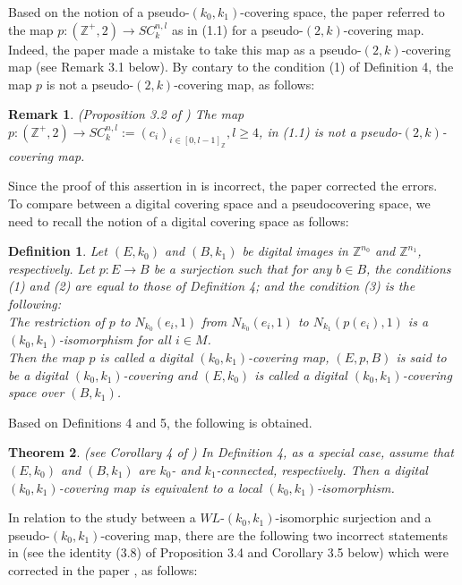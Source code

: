 \documentclass[J,12pt]{amsart}
\newtheorem{theorem}{Theorem}[section]
\newtheorem{definition}{Definition}
\newtheorem{remark}[theorem]{Remark}
\begin{document}
Based on the notion of a pseudo-$(k_0, k_1)$-covering space, 
the paper \cite{H6} referred to the map $p:({\mathbb Z}^+, 2) \to SC_k^{n,l}$ as in (1.1) for a pseudo-$(2,k)$-covering map. 
Indeed, the paper \cite{H6} made a mistake to take this map as a pseudo-$(2,k)$-covering map (see Remark 3.1 below).
By contary to the condition (1) of Definition 4, the map $p$ is not a pseudo-$(2,k)$-covering map, as follows:

\begin{remark} (Proposition 3.2 of \cite{P1})
	The map $p:({\mathbb Z}^+,2) \to SC_k^{n,l}:=(c_i)_{i \in [0, l-1]_{\mathbb Z}}, l \geq 4$, in (1.1) is not a pseudo-$(2,k)$-covering map.
\end{remark}
Since the proof of this assertion in \cite{P1} is incorrect, the paper \cite{H10}
corrected the errors.\\

To compare between a digital covering space and a pseudocovering space, we need to recall 
the notion of a digital covering space as follows:

\begin{definition} \cite{H2,H3,H5}
	Let $(E, k_0)$ and $(B, k_1)$ be digital images in  ${\mathbb Z}^{n_0}$  and  ${\mathbb Z}^{n_1}$, respectively.
	Let $p: E \to B $ be a surjection such that for any $b \in B$,
	the conditions (1) and (2) are equal to those of Definition 4; and the condition (3) is 
	the following:\\
	The restriction of $p$ to $N_{k_0}(e_i, 1)$ from $N_{k_0}(e_i, 1)$ to $N_{k_1}(p(e_i), 1)$ is a $(k_0, k_1)$-isomorphism for all $i \in M$.\\
	Then the map $p$ is called a digital $(k_0, k_1)$-covering map, $(E, p,
	B)$ is said to be a digital $(k_0, k_1)$-covering and $(E, k_0)$ is called a digital $(k_0, k_1)$-covering space over $(B, k_1)$.
\end{definition}
Based on Definitions 4 and 5, the following is obtained. 

\begin{theorem}  (see Corollary 4 of \cite{H8})
	In Definition 4, as a special case, assume that	$(E, k_0)$  and $(B, k_1)$ are 
	$k_0$- and $k_1$-connected, respectively.
	Then a digital $(k_0, k_1)$-covering map is equivalent to a local $(k_0, k_1)$-isomorphism. 
	\end{theorem}

In relation to the study between a $WL$-$(k_0, k_1)$-isomorphic surjection and a  pseudo-$(k_0, k_1)$-covering map,  there are the following two incorrect statements in \cite{H9} (see the identity (3.8) of Proposition 3.4 and Corollary 3.5 below) which were corrected in the paper \cite{H10}, as follows:
\end{document}
